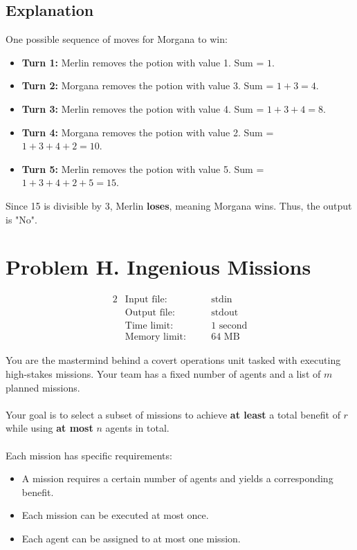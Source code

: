 \documentclass[12pt,a4paper]{article}
\begin{document}
\subsection*{\fontsize{16}{12}Explanation}
One possible sequence of moves for Morgana to win:
\begin{itemize}
    \item \textbf{Turn 1:} Merlin removes the potion with value 1. Sum = \( 1 \).
    \item \textbf{Turn 2:} Morgana removes the potion with value 3. Sum = \( 1 + 3 = 4 \).
    \item \textbf{Turn 3:} Merlin removes the potion with value 4. Sum = \( 1 + 3 + 4 = 8 \).
    \item \textbf{Turn 4:} Morgana removes the potion with value 2. Sum = \( 1 + 3 + 4 + 2 = 10 \).
    \item \textbf{Turn 5:} Merlin removes the potion with value 5. Sum = \( 1 + 3 + 4 + 2 + 5 = 15 \).
\end{itemize}
Since 15 is divisible by 3, Merlin \textbf{loses}, meaning Morgana wins. Thus, the output is "No".

\newpage

\section*{\fontsize{18}{12}Problem H. Ingenious Missions}

\begin{alignat*} {2}
 &   \text{Input file:}   \quad     &&\text{stdin}\\
 &   \text{Output file:}  \quad     &&\text{stdout}\\
 &   \text{Time limit:}   \quad     &&\text{1 second}\\
 &   \text{Memory limit:} \quad     &&\text{64 MB}
\end{alignat*}

\noindent
You are the mastermind behind a covert operations unit tasked with executing high-stakes missions. Your team has a fixed number of agents and a list of \( m \) planned missions. 
\\\\
\noindent
Your goal is to select a subset of missions to achieve \textbf{at least} a total benefit of \( r \) while using \textbf{at most} \( n \) agents in total.
\\\\
\noindent
Each mission has specific requirements:
\begin{itemize}
  \item A mission requires a certain number of agents and yields a corresponding benefit.
  \item Each mission can be executed at most once.
  \item Each agent can be assigned to at most one mission.
\end{itemize}
\end{document}
